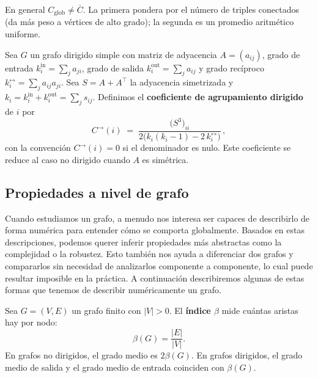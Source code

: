             \begin{observacion}
                En general $C_{\mathrm{glob}}\neq \overline{C}$. La primera pondera por el número de triples conectados (da más peso a vértices de alto grado); la segunda es un promedio aritmético uniforme.
            \end{observacion}
            
            \begin{definicion}
                Sea $G$ un grafo dirigido simple con matriz de adyacencia $A=(a_{ij})$, grado de entrada $k_i^{\mathrm{in}}=\sum_j a_{ji}$, grado de salida $k_i^{\mathrm{out}}=\sum_j a_{ij}$ y grado recíproco $k_i^{\leftrightarrow}=\sum_j a_{ij}a_{ji}$. Sea $S=A+A^\top$ la adyacencia simetrizada y $k_i=k_i^{\mathrm{in}}+k_i^{\mathrm{out}}=\sum_j s_{ij}$. Definimos el \textbf{coeficiente de agrupamiento dirigido} de $i$ por
                \[
                C^{\rightarrow}(i)\;=\;\frac{\big(S^3\big)_{ii}}{2\big(k_i(k_i-1)-2\,k_i^{\leftrightarrow}\big)}\,,
                \]
                con la convención $C^{\rightarrow}(i)=0$ si el denominador es nulo. Este coeficiente se reduce al caso no dirigido cuando $A$ es simétrica.
            \end{definicion}

        \subsection{Propiedades a nivel de grafo}

            Cuando estudiamos un grafo, a menudo nos interesa ser capaces de describirlo de forma numérica para entender cómo se comporta globalmente. Basados en estas descripciones, podemos querer inferir propiedades más abstractas como la complejidad o la robustez. Esto también nos ayuda a diferenciar dos grafos y compararlos sin necesidad de analizarlos componente a componente, lo cual puede resultar imposible en la práctica. A continuación describiremos algunas de estas formas que tenemos de describir numéricamente un grafo.

            \begin{definicion}
                Sea $G=(V,E)$ un grafo finito con $|V|>0$. El \textbf{índice $\beta$} mide cuántas aristas hay por nodo:
                \[
                \beta(G) = \frac{|E|}{|V|}.
                \]
                En grafos no dirigidos, el grado medio es $2\beta(G)$. En grafos dirigidos, el grado medio de salida y el grado medio de entrada coinciden con $\beta(G)$.
            \end{definicion}

